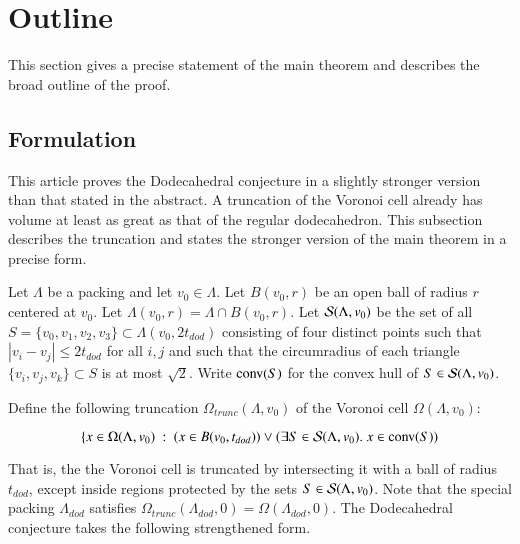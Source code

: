 \documentclass{article} %
\begin{document}
\section{Outline}

This section gives a precise statement of the main theorem
and describes the broad outline of the proof.

\subsection{Formulation}
\label{sec:form}

This article proves the Dodecahedral conjecture in a slightly stronger
version than that stated in the abstract. A truncation of the Voronoi
cell already has volume at least as great as that of the regular
dodecahedron. This subsection describes the truncation and states the
stronger version of the main theorem in a precise form.

Let $\Lambda$ be a packing and let $v_0\in\Lambda$. Let $B(v_0,r)$ be
an open ball of radius $r$ centered at $v_0$. Let $\Lambda(v_0,r) =
\Lambda\cap B(v_0,r)$. Let ${\mathcal S}(\Lambda,v_0)$ be the set of all
$S=\{v_0,v_1,v_2,v_3\}\subset\Lambda(v_0,2t_{dod})$ consisting of four
distinct points such that $|v_i-v_j|\le 2t_{dod}$ for all $i,j$ and
such that the circumradius of each triangle $\{v_i,v_j,v_k\}\subset S$
is at most $\sqrt2$. Write ${\operatorname{conv}}(S)$ for the convex hull of
$S\in{\mathcal S}(\Lambda,v_0)$.


Define the following truncation $\Omega_{trunc}(\Lambda,v_0)$ 
of the Voronoi cell $\Omega(\Lambda,v_0)$:

$$
\{x \in \Omega(\Lambda,v_0) \ :\  (x\in B(v_0,t_{dod})) \vee (\exists S\in {\mathcal S}(\Lambda,v_0).\ x \in {\operatorname{conv}}(S))
$$



That is, the the Voronoi cell is truncated by intersecting it with a
ball of radius $t_{dod}$, except inside regions protected by the sets
$S\in{\mathcal S}(\Lambda,v_0)$. Note that the special packing
$\Lambda_{dod}$ satisfies 
$\Omega_{trunc}(\Lambda_{dod},0) = \Omega(\Lambda_{dod},0)$. 
The Dodecahedral conjecture takes the following strengthened form.
\end{document}
